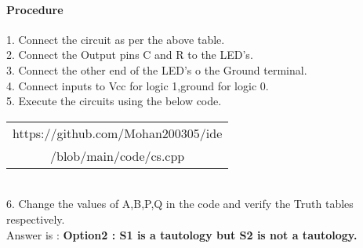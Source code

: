 \documentclass[journal,12pt,twocolumn]{IEEEtran}
\begin{document}
\paragraph{Procedure}

   1. Connect the circuit as per the above table.\\
   2. Connect the Output pins C and R to the LED's.\\
   3. Connect the other end of the LED's o the Ground terminal.\\
   4. Connect inputs to Vcc for logic 1,ground for logic 0.\\
   5. Execute the circuits using the below code.\\
   \begin{table}[h]
	   \centering
	   \begin{tabular}{|c|}
	   \hline
	   https://github.com/Mohan200305/ide\\
	   /blob/main/code/cs.cpp\\
	   \hline
	   \end{tabular}
   \end{table}\\
   6. Change the values of A,B,P,Q in the code and verify the Truth tables respectively.\\

   Answer is :
   \textbf{Option2 : S1 is a tautology but S2 is not a tautology.}

\end{document}
